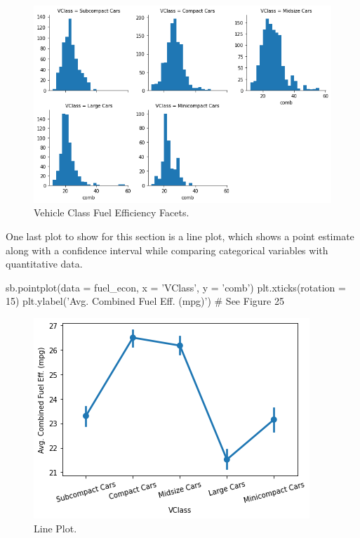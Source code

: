 \begin{figure}
	\includegraphics[width=\textwidth,height=\textheight,keepaspectratio]{images/figure24.png}
	\caption{Vehicle Class Fuel Efficiency Facets.}\label{fig:figure24}
\end{figure}

\newpage
One last plot to show for this section is a line plot, which shows a point estimate along with a confidence interval while comparing categorical variables with quantitative data.

\begin{python}
	sb.pointplot(data = fuel_econ, x = 'VClass', y = 'comb')
	plt.xticks(rotation = 15)
	plt.ylabel('Avg. Combined Fuel Eff. (mpg)')
	# See Figure 25
\end{python}

\begin{figure}
	\includegraphics{images/figure25.png}
	\caption{Line Plot.}\label{fig:figure25}
\end{figure}